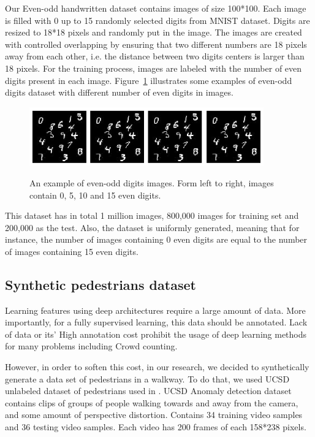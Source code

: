 Our Even-odd handwritten dataset contains images of size 100*100. Each image is filled with 0 up to 15 randomly selected digits from MNIST dataset. Digits are resized to 18*18 pixels and randomly put in the image. The images are created with controlled overlapping by ensuring that two different numbers are 18 pixels away from each other, i.e. the distance between two digits centers is larger than 18 pixels. For the training process, images are labeled with the number of even digits present in each image. Figure~\ref{fig:l2cmnist} illustrates some examples of even-odd digits dataset with different number of even digits in images. 

\begin{figure}[H]
	\centering
	{\includegraphics[width=0.9\textwidth]{images/l2cmnist}}
		\caption{An example of even-odd digits images. Form left to right, images contain 0, 5, 10 and 15 even digits.}
	\label{fig:l2cmnist}
\end{figure}

\indent This dataset has in total 1 million images, 800,000 images for training set and 200,000 as the test. Also, the dataset is uniformly generated, meaning that for instance, the number of images containing 0 even digits are equal to the number of images containing 15 even digits.  

\subsection{Synthetic pedestrians dataset}

Learning features using deep architectures require a large amount of data. More importantly, for a fully supervised learning, this data should be annotated. Lack of data or its' High annotation cost prohibit the usage of deep learning methods for many problems including Crowd counting. 

\indent However, in order to soften this cost, in our research, we decided to synthetically generate a data set of pedestrians in a walkway. To do that, we used UCSD unlabeled dataset of pedestrians used in \cite{chan2009analysis, mahadevan2010anomaly, li2014anomaly}. UCSD Anomaly detection dataset contains clips of groups of people walking towards and away from the camera, and some amount of perspective distortion. Contains 34 training video samples and 36 testing video samples. Each video has 200 frames of each 158*238 pixels.


